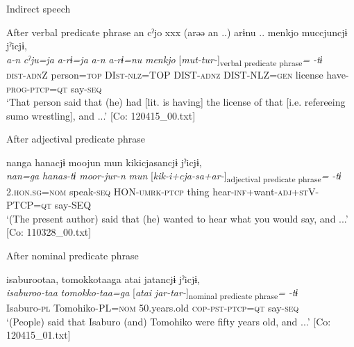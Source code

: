 \ea\label{ex:10.63}   Indirect speech\\
  \begin{xlist}
  \exi{} After verbal predicate phrase
    \ex  %
      \glll    an  cˀjo  xxx  (arəə  an ..)   arɨnu ..  {\textbar}menkjo{\textbar}  muccjuncjɨ  jˀicjɨ,\\
      \textit{a-n}  \textit{cˀju=ja}    \textit{a-rɨ=ja}  \textit{a-n}   \textit{a-rɨ=nu}  \textit{menkjo}  [\textit{mut-tur-}]\textsubscript{verbal predicate phrase}\textit{=}  \textit{-tɨ}\\
      \textsc{dist}-\textsc{adn}Z  person=\textsc{top}    DI\textsc{st}-\textsc{nlz}=TOP  DIST-\textsc{adnz}   DIST-NLZ=\textsc{gen}  license  have-\textsc{prog}-\textsc{ptcp}=\textsc{qt}  say-\textsc{seq}\\
      \glt       ‘That person said that (he) had [lit. is having] the license of that [i.e. refereeing sumo wrestling], and ...’ [Co: 120415\_00.txt]

  \exi{} After adjectival predicate phrase

  \ex{}%
      \glll    nanga  hanacjɨ  moojun  mun  kikicjasancjɨ  jˀicjɨ,\\
      \textit{nan=ga}  \textit{hanas-tɨ}  \textit{moor-jur-n}  \textit{mun}   [\textit{kik-i+cja-sa+ar-}]\textsubscript{adjectival predicate phrase}\textit{=}  \textit{-tɨ}\\
      2.\textsc{hon}.\textsc{sg}=\textsc{nom}  speak-\textsc{seq}  HON-\textsc{umrk}-\textsc{ptcp}  thing  hear-\textsc{inf}+want-\textsc{adj}+\textsc{st}V-PTCP=\textsc{qt}  say-SEQ\\
      \glt       ‘(The present author) said that (he) wanted to hear what you would say, and ...’ [Co: 110328\_00.txt]

  \exi{} After nominal predicate phrase

  \ex  %
      \glll    isaburootaa,  tomokkotaaga  atai  jatancjɨ  jˀicjɨ,\\
      \textit{isaburoo-taa}  \textit{tomokko-taa=ga}  [\textit{atai}  \textit{jar-tar-}]\textsubscript{nominal predicate phrase}\textit{=} \textit{-tɨ}\\
      Isaburo-\textsc{pl}  Tomohiko-PL=\textsc{nom}  50.years.old  \textsc{cop}-\textsc{pst}-\textsc{ptcp}=\textsc{qt}   say-\textsc{seq}\\
      \glt       ‘(People) said that Isaburo (and) Tomohiko were fifty years old, and ...’ [Co: 120415\_01.txt]
    \end{xlist}
\z

